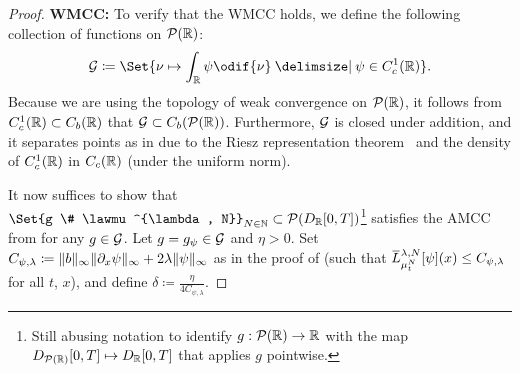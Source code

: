 \begin{proof}
  \textbf{WMCC:}
  To verify that the WMCC holds, we define the following collection of functions on \(\mathcal{P}(\mathbb{R})\):
  \begin{equation}
    \cG \coloneqq \Set{\nu \mapsto \int_\potspace \psi \odif{\nu} \given \psi \in C_c^1(\potspace)}.
  \end{equation}
  Because we are using the topology of weak convergence on \(\mathcal{P}(\mathbb{R})\), it follows from \(C_c^1(\mathbb{R}) \subset C_b(\mathbb{R})\) that \(\mathcal{G} \subset C_b(\mathcal{P}(\mathbb{R}))\).
  Furthermore, \( \mathcal{G} \) is closed under addition, and it separates points as in  due to the Riesz representation theorem~\cite[Thm. 2.14]{rudinRealComplexAnalysis2013} and the density of \( C_c^1(\mathbb{R}) \) in \( C_c(\mathbb{R}) \) (under the uniform norm).

  It now suffices to show that \( \Set{g \# \lawmu^{\lambda, N}}_{N\in\bN} \subset \cP(D_{\potspace}[0,T])\)\footnote{Still abusing notation to identify \( g : \mathcal{P}(\mathbb{R}) \to \mathbb{R} \) with the map \( D_{\mathcal{P}(\mathbb{R})}[0,T] \mapsto D_{\mathbb{R}}[0,T] \) that applies \( g \) pointwise.} satisfies the AMCC from  for any \( g \in \mathcal{G} \).
  Let \( g = g_\psi \in \mathcal{G} \) and \( \eta > 0 \).
  Set \( C_{\psi, \lambda} \coloneqq \lVert b\rVert_\infty \lVert\partial_x \psi\rVert_\infty + 2\lambda \lVert\psi\rVert_\infty \) as in the proof of  (such that \( \ol{L}_{\mu_t^N}^{\lambda,N} [\psi] (x) \leq C_{\psi, \lambda} \) for all \( t \), \( x \)), and define \(\delta \coloneqq \frac{\eta}{4C_{\psi, \lambda}}\).


\end{proof}
